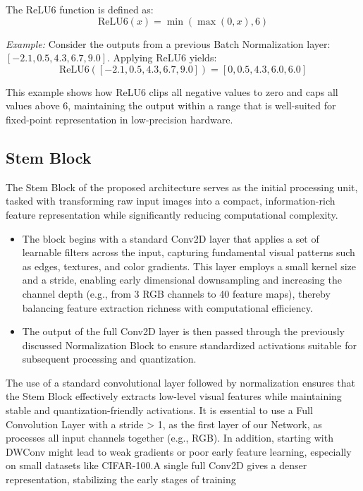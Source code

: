 \begin{itemize}
    The ReLU6 function is defined as:
    \[
    \text{ReLU6}(x) = \min(\max(0, x), 6)
    \]
    
    \textit{Example:} Consider the outputs from a previous Batch Normalization layer: $[-2.1, 0.5, 4.3, 6.7, 9.0]$. Applying ReLU6 yields:
    \[
    \text{ReLU6}([-2.1, 0.5, 4.3, 6.7, 9.0]) = [0, 0.5, 4.3, 6.0, 6.0]
    \]
    
    This example shows how ReLU6 clips all negative values to zero and caps all values above 6, maintaining the output within a range that is well-suited for fixed-point representation in low-precision hardware.
    
\end{itemize}

\subsection{Stem Block}

The Stem Block of the proposed architecture serves as the initial processing unit, tasked with transforming raw input images into a compact, information-rich feature representation while significantly reducing computational complexity. 

\begin{itemize}

    \item The block begins with a standard Conv2D layer that applies a set of learnable filters across the input, capturing fundamental visual patterns such as edges, textures, and color gradients. This layer employs a small kernel size and a stride, enabling early dimensional downsampling and increasing the channel depth (e.g., from 3 RGB channels to 40 feature maps), thereby balancing feature extraction richness with computational efficiency.
    
    \item The output of the full Conv2D layer is then passed through the previously discussed Normalization Block to ensure standardized activations suitable for subsequent processing and quantization.
    
\end{itemize}

The use of a standard convolutional layer followed by normalization ensures that the Stem Block effectively extracts low-level visual features while maintaining stable and quantization-friendly activations. It is essential to use a Full Convolution Layer with a stride > 1,  as the first layer of our Network, as processes all input channels together (e.g., RGB). In addition, starting with DWConv might lead to weak gradients or poor early feature learning, especially on small datasets like CIFAR-100.A single full Conv2D gives a denser representation, stabilizing the early stages of training 
\cite{ConvNetworksMobileNets}


